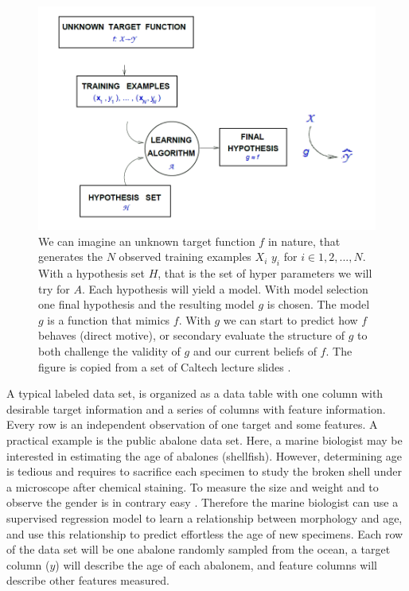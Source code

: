 \begin{figure}[!htbp]
\includegraphics[width=\textwidth,height=\textheight,keepaspectratio]{graphics/sketchMLmapping.png}
\caption{We can imagine an unknown target function $f$ in nature, that generates the $N$ observed training examples $X_i$ $y_i$ for $i \in 1,2,...,N$. With a hypothesis set $H$, that is the set of hyper parameters we will try for $A$. Each hypothesis will yield a model. With model selection one final hypothesis and the resulting model $g$ is chosen. The model $g$ is a function that mimics $f$. With $g$ we can start to predict how $f$ behaves (direct motive), or secondary evaluate the structure of $g$ to both challenge the validity of $g$ and our current beliefs of $f$.
The figure is copied from a set of Caltech lecture slides \cite{Mostafa2013learning}.
}
\label{modelPredictExplain}
\end{figure}

A typical labeled data set, is organized as a data table with one column with desirable target information and a series of columns with feature information. Every row is an independent observation of one target and some features. A practical example is the public abalone data set. Here, a marine biologist may be interested in estimating the age of abalones (shellfish). However, determining age is tedious and requires to sacrifice each specimen to study the broken shell under a microscope after chemical staining. To measure the size and weight and to observe the gender is in contrary easy \cite{lichman2013uci}. Therefore the marine biologist can use a supervised regression model to learn a relationship between morphology and age, and use this relationship to predict effortless the age of new specimens. Each row of the data set will be one abalone randomly sampled from the ocean, a target column ($y$) will describe the age of each abalonem, and feature columns will describe other features measured.


